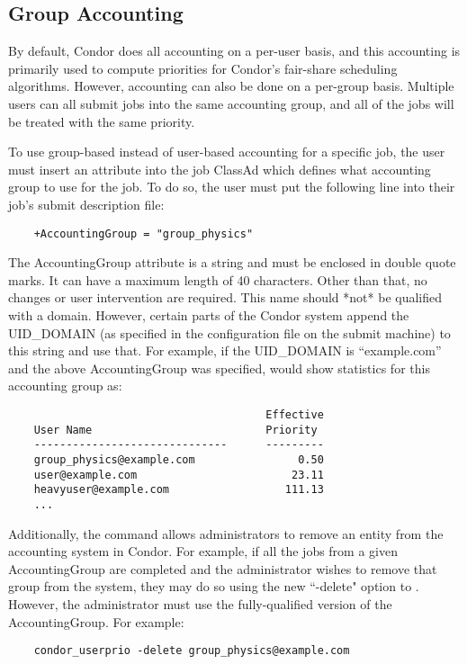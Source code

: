 \subsection{Group Accounting}
\label{sec:group-accounting}

By default, Condor does all accounting on a per-user basis, and this
accounting is primarily used to compute priorities for Condor's
fair-share scheduling algorithms. However, accounting can also be done
on a per-group basis.  Multiple users can all submit jobs into the
same accounting group, and all of the jobs will be treated with the
same priority.

To use group-based instead of user-based accounting for a specific
job, the user must insert an attribute into the job ClassAd which
defines what accounting group to use for the job.  To do so, the user
must put the following line into their job's submit description file:
\begin{verbatim}
    +AccountingGroup = "group_physics"
\end{verbatim}

The AccountingGroup attribute is a string and must be enclosed in
double quote marks.  It can have a maximum length of 40 characters.
Other than that, no changes or user intervention are required.  This
name should *not* be qualified with a domain.  However, certain parts
of the Condor system append the UID\_DOMAIN (as specified in the
configuration file on the submit machine) to this string and use that.
For example, if the UID\_DOMAIN is ``example.com'' and the above
AccountingGroup was specified,  would show statistics
for this accounting group as:
\begin{verbatim}
                                        Effective
    User Name                           Priority
    ------------------------------      ---------
    group_physics@example.com                0.50
    user@example.com                        23.11
    heavyuser@example.com                  111.13
    ...
\end{verbatim}

Additionally, the  command allows administrators to
remove an entity from the accounting system in Condor.  For example,
if all the jobs from a given AccountingGroup are completed and the
administrator wishes to remove that group from the system, they may do
so using the new ``-delete" option to .  However, the
administrator must use the fully-qualified version of the
AccountingGroup. For example:
\begin{verbatim}
    condor_userprio -delete group_physics@example.com
\end{verbatim}

